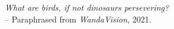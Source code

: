 \thispagestyle{empty}
{}

\vspace*{3cm}

\begin{center}
    \large\emph{What are birds, if not dinosaurs persevering?}\\
    \medskip
    -- \small{Paraphrased from \textit{WandaVision}, 2021.}
\end{center}


